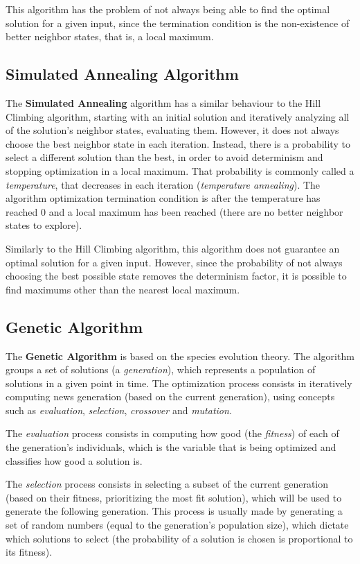 \documentclass[conference]{IEEEtran}
\begin{document}
This algorithm has the problem of not always being able to find the optimal solution for a given input, since the termination condition is the non-existence of better neighbor states, that is, a local maximum.

\subsection{Simulated Annealing Algorithm}

The \textbf{Simulated Annealing} algorithm has a similar behaviour to the Hill Climbing algorithm, starting with an initial solution and iteratively analyzing all of the solution's neighbor states, evaluating them. However, it does not always choose the best neighbor state in each iteration. Instead, there is a probability to select a different solution than the best, in order to avoid determinism and stopping optimization in a local maximum. That probability is commonly called a \textit{temperature}, that decreases in each iteration (\textit{temperature annealing}). The algorithm optimization termination condition is after the temperature has reached 0 and a local maximum has been reached (there are no better neighbor states to explore).

Similarly to the Hill Climbing algorithm, this algorithm does not guarantee an optimal solution for a given input. However, since the probability of not always choosing the best possible state removes the determinism factor, it is possible to find maximums other than the nearest local maximum.

\subsection{Genetic Algorithm}

The \textbf{Genetic Algorithm} is based on the species evolution theory. The algorithm groups a set of solutions (a \textit{generation}), which represents a population of solutions in a given point in time. The optimization process consists in iteratively computing news generation (based on the current generation), using concepts such as \textit{evaluation}, \textit{selection}, \textit{crossover} and \textit{mutation}. 

The \textit{evaluation} process consists in computing how good (the \textit{fitness}) of each of the generation's individuals, which is the variable that is being optimized and classifies how good a solution is.

The \textit{selection} process consists in selecting a subset of the current generation (based on their fitness, prioritizing the most fit solution), which will be used to generate the following generation. This process is usually made by generating a set of random numbers (equal to the generation's population size), which dictate which solutions to select (the probability of a solution is chosen is proportional to its fitness).
\end{document}
